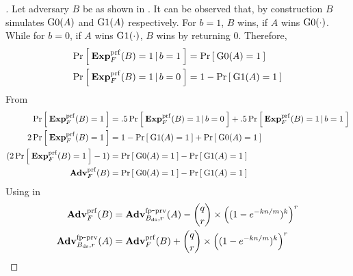 \begin{proof}[]
Let adversary $B$ be as  shown in . It can be observed that, by construction $B$ simulates $\text{G0}(A)$ and $\text{G1}(A)$ respectively. For $b=1$, $B$ wins, if $A$ wins $\text{G0}(\cdot)$. While for $b = 0$, if $A$ wins $\text{G1}(\cdot)$, $B$ wins by returning 0. Therefore,
\begin{align}
\Pr\left[\: \mathbf{Exp}^{\mathrm{prf}}_{F}(B) = 1\,|\,b=1 \:\right] &= \Pr\left[\: \text{G0}(A)=1 \:\right]\label{eq:2T9}\\
\Pr\left[\: \mathbf{Exp}^{\mathrm{prf}}_{F}(B) = 1\,|\,b=0 \:\right] &= 1-\Pr\left[\: \text{G1}(A)=1 \:\right]\label{eq:2T10}
\end{align}
\noindent
From 
\begin{align}
\nonumber \Pr\left[\: \mathbf{Exp}^{\mathrm{prf}}_{F}(B) = 1 \:\right] &= .5\Pr\left[\: \mathbf{Exp}^{\mathrm{prf}}_{F}(B)=1\,|\,b=0 \:\right] + .5\Pr\left[\: \mathbf{Exp}^{\mathrm{prf}}_{F}(B) = 1\,|\,b=1 \:\right]\\
\nonumber 2\Pr\left[\: \mathbf{Exp}^{\mathrm{prf}}_{F}(B) = 1 \:\right] &= 1-\Pr\left[\: \text{G1}(A)=1 \:\right] + \Pr\left[\: \text{G0}(A)=1 \:\right]\\
\nonumber (2\Pr\left[\: \mathbf{Exp}^{\mathrm{prf}}_{F}(B) = 1 \:\right] - 1)  &= \Pr\left[\: \text{G0}(A)=1 \:\right] - \Pr\left[\: \text{G1}(A)=1 \:\right]\\
 \mathbf{Adv}^{\mathrm{prf}}_{F}(B) &= \Pr\left[\: \text{G0}(A)=1 \:\right] - \Pr\left[\: \text{G1}(A)=1 \:\right] \label{eq:2T11}
\end{align}
\noindent
Using  in 
\begin{align}
 \nonumber \mathbf{Adv}^{\mathrm{prf}}_{F}(B) &= \mathrm{\mathbf{Adv}}^{\mathrm{fp\mbox{-}prv}}_{B_\mathrm{ds},r}(A) - \dbinom{q}{r} \times \left( (1-e^{-kn/m})^k  \right)^r \\
\mathrm{\mathbf{Adv}}^{\mathrm{fp\mbox{-}prv}}_{B_\mathrm{ds},r}(A) &= \mathbf{Adv}^{\mathrm{prf}}_{F}(B) + \dbinom{q}{r} \times \left( (1-e^{-kn/m})^k  \right)^r\label{eq:2T12}
\end{align}
\end{proof}

